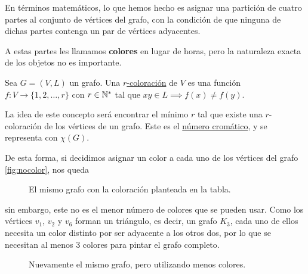 En términos matemáticos, lo que hemos hecho es asignar una partición de cuatro partes al conjunto de vértices del grafo, con la condición de que ninguna de dichas partes contenga un par de vértices adyacentes.

A estas partes les llamamos \textbf{colores} en lugar de horas, pero la naturaleza exacta de los objetos no es importante.

\begin{defn}
    Sea $G=(V,L)$ un grafo. Una \ul{$r$-coloración} de $V$ es una función $f: V \rightarrow \{ 1, 2, \dots, r \}$ con $r \in \mathbb{N}^*$ tal que $xy \in L \implies f(x) \neq f(y)$.
    
    La idea de este concepto será encontrar el mínimo $r$ tal que existe una $r$-coloración de los vértices de un grafo. Este es el \ul{número cromático}, y se representa con $\chi(G)$.
\end{defn}

De esta forma, si decidimos asignar un color a cada uno de los vértices del grafo \ref{fig:nocolor}, nos queda

\begin{figure}
    \centering
    \caption{El mismo grafo con la coloración planteada en la tabla.}
    \label{fig:color}
\end{figure}

\noindent sin embargo, este no es el menor número de colores que se pueden usar. Como los vértices $v_1$, $v_2$ y $v_6$ forman un triángulo, es decir, un grafo $K_3$, cada uno de ellos necesita un color distinto por ser adyacente a los otros dos, por lo que se necesitan al menos 3 colores para pintar el grafo completo.

\begin{figure}
    \centering
    \caption{Nuevamente el mismo grafo, pero utilizando menos colores.}
    \label{fig:color2}
\end{figure}

